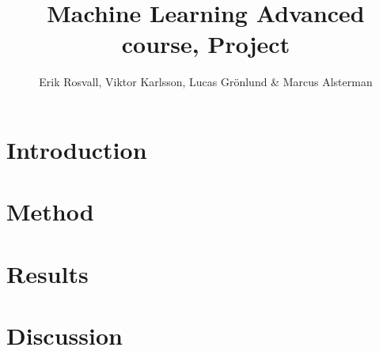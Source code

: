 \documentclass[10pt,a4paper]{report}
\author{Erik Rosvall, Viktor Karlsson, Lucas Grönlund \& Marcus Alsterman}
\title{Machine Learning Advanced course, Project}
\begin{document}
	\maketitle
	
	\section{Introduction}
	
	
	\section{Method}
	
	
	\section{Results}
	
	
	\section{Discussion}
	
	
\end{document}
